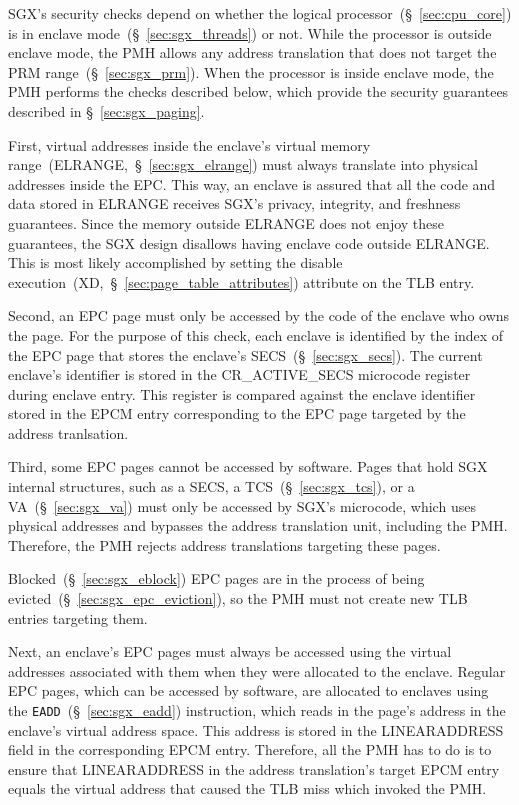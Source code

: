 SGX's security checks depend on whether the logical
processor~(\S~\ref{sec:cpu_core}) is in enclave mode~(\S~\ref{sec:sgx_threads})
or not. While the processor is outside enclave mode, the PMH allows any address
translation that does not target the PRM range~(\S~\ref{sec:sgx_prm}). When the
processor is inside enclave mode, the PMH performs the checks described below,
which provide the security guarantees described in \S~\ref{sec:sgx_paging}.

First, virtual addresses inside the enclave's virtual memory
range~(ELRANGE,~\S~\ref{sec:sgx_elrange}) must always translate into physical
addresses inside the EPC. This way, an enclave is assured that all the code and
data stored in ELRANGE receives SGX's privacy, integrity, and freshness
guarantees. Since the memory outside ELRANGE does not enjoy these guarantees,
the SGX design disallows having enclave code outside ELRANGE. This is most
likely accomplished by setting the disable
execution~(XD,~\S~\ref{sec:page_table_attributes}) attribute on the TLB entry.

Second, an EPC page must only be accessed by the code of the enclave who owns
the page. For the purpose of this check, each enclave is identified by the
index of the EPC page that stores the enclave's SECS~(\S~\ref{sec:sgx_secs}).
The current enclave's identifier is stored in the CR\_ACTIVE\_SECS microcode
register during enclave entry. This register is compared against the enclave
identifier stored in the EPCM entry corresponding to the EPC page targeted by
the address tranlsation.


Third, some EPC pages cannot be accessed by software. Pages that hold SGX
internal structures, such as a SECS, a TCS~(\S~\ref{sec:sgx_tcs}), or a
VA~(\S~\ref{sec:sgx_va}) must only be accessed by SGX's microcode, which uses
physical addresses and bypasses the address translation unit, including the
PMH. Therefore, the PMH rejects address translations targeting these pages.

Blocked~(\S~\ref{sec:sgx_eblock}) EPC pages are in the process of being
evicted~(\S~\ref{sec:sgx_epc_eviction}), so the PMH must not create new TLB
entries targeting them.

Next, an enclave's EPC pages must always be accessed using the virtual
addresses associated with them when they were allocated to the enclave. Regular
EPC pages, which can be accessed by software, are allocated to enclaves using
the \texttt{EADD}~(\S~\ref{sec:sgx_eadd}) instruction, which reads in the
page's address in the enclave's virtual address space. This address is stored
in the LINEARADDRESS field in the corresponding EPCM entry. Therefore, all the
PMH has to do is to ensure that LINEARADDRESS in the address translation's
target EPCM entry equals the virtual address that caused the TLB miss which
invoked the PMH.

